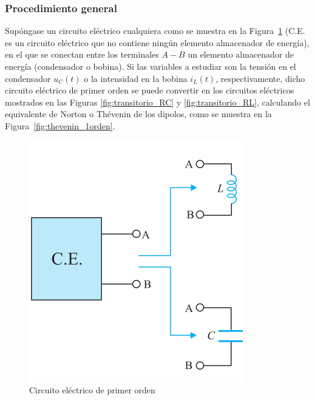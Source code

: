 
	
	
	
	
	
	
	
	
\subsubsection{Procedimiento general}
	
Supóngase un circuito eléctrico cualquiera como se muestra en la
Figura~\ref{fig:CE_primerorden} (C.E. es un circuito eléctrico que no
contiene ningún elemento almacenador de energía), en el que se
conectan entre los terminales $A-B$ un elemento almacenador de energía
(condensador o bobina). Si las variables a estudiar son la tensión en
el condensador $u_C(t)$ o la intensidad en la bobina $i_L(t)$,
respectivamente, dicho circuito eléctrico de primer orden se puede
convertir en los circuitos eléctricos mostrados en las Figuras
\ref{fig:transitorio_RC} y \ref{fig:transitorio_RL}, calculando el
equivalente de Norton o Thévenin de los dipolos, como se muestra en la
Figura~\ref{fig:thevenin_1orden}.
\begin{figure}[H]
  \centering
  \includegraphics[width=0.3\linewidth]{../figs/CE_primerorden.pdf}
  \caption{Circuito eléctrico de primer
    orden} \label{fig:CE_primerorden}
\end{figure}
	

